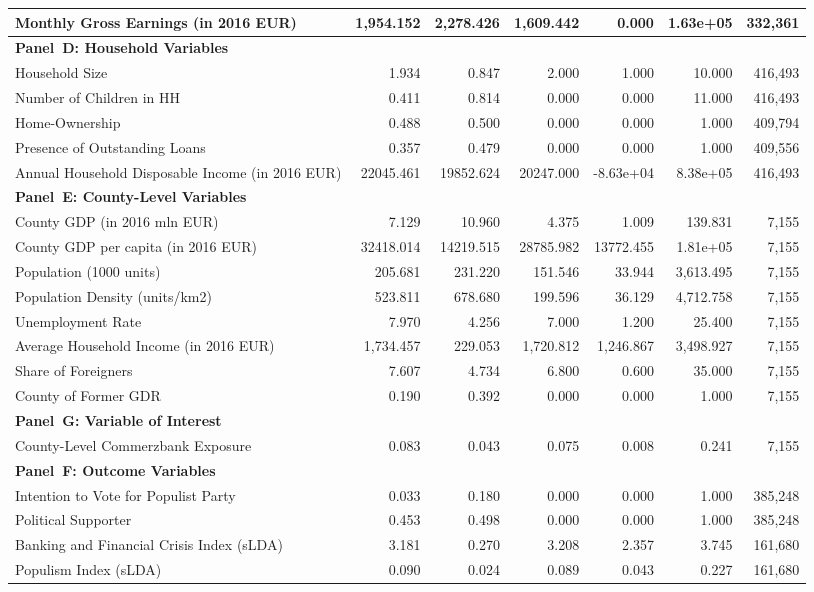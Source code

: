 \begin{tabular}{l*{1}{rrrrrr}}
Monthly Gross Earnings (in 2016 EUR) 
& 1,954.152 & 2,278.426 & 1,609.442 & 0.000 & 1.63e+05 & 332,361\\
\midrule
\multicolumn{7}{l}{\textbf{Panel~D: Household Variables}}\\
Household Size 
& 1.934 & 0.847 & 2.000 & 1.000 & 10.000 & 416,493\\
Number of Children in HH 
& 0.411 & 0.814 & 0.000 & 0.000 & 11.000 & 416,493\\
Home-Ownership 
& 0.488 & 0.500 & 0.000 & 0.000 & 1.000 & 409,794\\
Presence of Outstanding Loans 
& 0.357 & 0.479 & 0.000 & 0.000 & 1.000 & 409,556\\
Annual Household Disposable Income (in 2016 EUR) 
& 22045.461 & 19852.624 & 20247.000 & -8.63e+04 & 8.38e+05 & 416,493\\
\midrule
\multicolumn{7}{l}{\textbf{Panel~E: County-Level Variables}}\\
County GDP (in 2016 mln EUR) 
& 7.129 & 10.960 & 4.375 & 1.009 & 139.831 & 7,155\\
County GDP per capita (in 2016 EUR) 
& 32418.014 & 14219.515 & 28785.982 & 13772.455 & 1.81e+05 & 7,155\\
Population (1000 units) 
& 205.681 & 231.220 & 151.546 & 33.944 & 3,613.495 & 7,155\\
Population Density (units/km2) 
& 523.811 & 678.680 & 199.596 & 36.129 & 4,712.758 & 7,155\\
Unemployment Rate 
& 7.970 & 4.256 & 7.000 & 1.200 & 25.400 & 7,155\\
Average Household Income (in 2016 EUR) 
& 1,734.457 & 229.053 & 1,720.812 & 1,246.867 & 3,498.927 & 7,155\\
Share of Foreigners 
& 7.607 & 4.734 & 6.800 & 0.600 & 35.000 & 7,155\\
County of Former GDR 
& 0.190 & 0.392 & 0.000 & 0.000 & 1.000 & 7,155\\
\midrule
\multicolumn{7}{l}{\textbf{Panel~G: Variable of Interest}}\\
County-Level Commerzbank Exposure 
& 0.083 & 0.043 & 0.075 & 0.008 & 0.241 & 7,155\\
\midrule
\multicolumn{7}{l}{\textbf{Panel~F: Outcome Variables}}\\
Intention to Vote for Populist Party 
& 0.033 & 0.180 & 0.000 & 0.000 & 1.000 & 385,248\\
Political Supporter 
& 0.453 & 0.498 & 0.000 & 0.000 & 1.000 & 385,248\\
Banking and Financial Crisis Index (sLDA) 
& 3.181 & 0.270 & 3.208 & 2.357 & 3.745 & 161,680\\
Populism Index (sLDA) 
& 0.090 & 0.024 & 0.089 & 0.043 & 0.227 & 161,680\\
\bottomrule
\end{tabular}